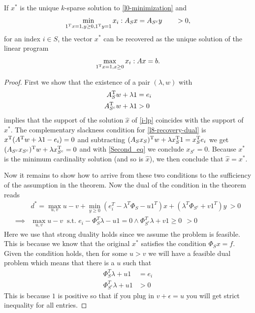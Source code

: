 \documentclass{article} %
\begin{document}
\begin{lemma} \label{thm:linftyunique}
If $x^*$ is the unique $k$-sparse solution to \eqref{l0-minimization} and
\begin{equation*}
\min_{1^Tx = 1, y\geq 0, 1^{\rm T} y =1} x_i : A_S x = A_{S^c} y \qquad>0,
\end{equation*}
for an index $i\in S$, the vector $x^*$ can be recovered as the unique solution of the linear program
\begin{equation}\label{i-lp}
  \max_{1^{\rm T} x = 1, x\geq 0} x_i : Ax = b.
\end{equation}

\end{lemma}
\begin{proof} \cite{mert}
First we show that the existence of a pair $(\lambda, w)$ with
\begin{align}
A^{\rm T}_{S}w + \lambda 1 &= e_i \label{First_eq}\\
A^{\rm T}_{S^c}w + \lambda 1 &>0 \label{Second_eq}
\end{align}
implies that the support of the solution $\hat x$ of \eqref{i-lp} coincides with the support of $x^*$. The complementary slackness condition for \eqref{l8-recovery-dual} is $x^{\rm T}(A^{\rm T} w + \lambda 1 - e_i) = 0$ and subtracting $(A_Sx_S)^{\rm T} w + \lambda x_S^{\rm T} 1 = x_S^{\rm T} e_i$ we get $(A_{S^c} x_{S^c})^{\rm T} w + \lambda x_{S^c}^{\rm T} = 0$ and with \eqref{Second_eq} we conclude $x_{S^c}= 0$. Because $x^*$ is the minimum cardinality solution (and so is $\hat x$), we then conclude that $\hat x = x^*$.

Now it remains to show how to arrive from these two conditions to the sufficiency of the assumption in the theorem. Now the dual of the condition in the theorem reads
\begin{align*}
&d^* = \max_{u,v} u -v +\min_{y\geq 0} (e_i^T - \lambda^T\Phi_S - u1^T) x + (\lambda^T \Phi_{S^c} + v1^T) y\: >0\\
\implies &\max_{u,v} u-v \:  \text{ s.t. } e_i - \Phi_S^T \lambda - u1 = 0 \wedge \Phi_{S^c}^T \lambda + v1\geq 0 \:\: >0
\end{align*}
Here we use that strong duality holds since we assume the problem is feasible. This is because we know that the original $x^*$ satisfies the condition $\Phi_S x = f$. 
Given the condition holds, then for some $u>v$ we will have a feasible dual problem which means that there is a $u$ such that 
\begin{align*}
 \Phi_S^T \lambda +u1 &= e_i\\
\Phi_{S^c}^T \lambda + u1 &> 0 
\end{align*}
This is because $1$ is positive so that if you plug in $v+\epsilon = u$ you will get strict inequality for all entries. 
\end{proof}
\end{document}

